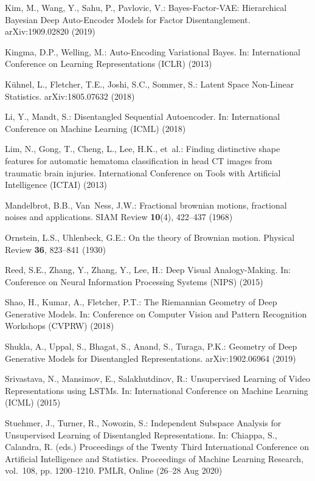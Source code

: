 \documentclass[runningheads]{llncs}
\begin{document}
\begin{thebibliography}{10}
	Kim, M., Wang, Y., Sahu, P., Pavlovic, V.: Bayes-{F}actor-{V}{A}{E}:
	{H}ierarchical {B}ayesian {D}eep {A}uto-{E}ncoder {M}odels for {F}actor
	{D}isentanglement. arXiv:1909.02820  (2019)
	
	Kingma, D.P., Welling, M.: Auto-{E}ncoding {V}ariational {B}ayes. In:
	International Conference on Learning Representations (ICLR) (2013)
	
	K{\"u}hnel, L., Fletcher, T.E., Joshi, S.C., Sommer, S.: Latent {S}pace
	{N}on-{L}inear {S}tatistics. arXiv:1805.07632  (2018)
	
	Li, Y., Mandt, S.: Disentangled {S}equential {A}utoencoder. In: International
	Conference on Machine Learning (ICML) (2018)
	
	Lim, N., Gong, T., Cheng, L., Lee, H.K., et~al.: Finding distinctive shape
	features for automatic hematoma classification in head {C}{T} images from
	traumatic brain injuries. International Conference on Tools with Artificial
	Intelligence (ICTAI)  (2013)
	
	Mandelbrot, B.B., Van~Ness, J.W.: Fractional brownian motions, fractional
	noises and applications. SIAM Review  \textbf{10}(4),  422--437 (1968)
	
	Ornstein, L.S., Uhlenbeck, G.E.: On the theory of {B}rownian motion. Physical
	Review  \textbf{36},  823--841 (1930)
	
	Reed, S.E., Zhang, Y., Zhang, Y., Lee, H.: Deep {V}isual {A}nalogy-{M}aking.
	In: Conference on Neural Information Processing Systems (NIPS) (2015)
	
	Shao, H., Kumar, A., Fletcher, P.T.: The {R}iemannian {G}eometry of {D}eep
	{G}enerative {M}odels. In: Conference on Computer Vision and Pattern
	Recognition Workshops (CVPRW) (2018)
	
	Shukla, A., Uppal, S., Bhagat, S., Anand, S., Turaga, P.K.: Geometry of {D}eep
	{G}enerative {M}odels for {D}isentangled {R}epresentations. arXiv:1902.06964
	(2019)
	
	Srivastava, N., Mansimov, E., Salakhutdinov, R.: Unsupervised {L}earning of
	{V}ideo {R}epresentations using {LSTM}s. In: International Conference on
	Machine Learning (ICML) (2015)
	
	Stuehmer, J., Turner, R., Nowozin, S.: Independent {S}ubspace {A}nalysis for
	{U}nsupervised {L}earning of {D}isentangled {R}epresentations. In: Chiappa,
	S., Calandra, R. (eds.) Proceedings of the Twenty Third International
	Conference on Artificial Intelligence and Statistics. Proceedings of Machine
	Learning Research, vol.~108, pp. 1200--1210. PMLR, Online (26--28 Aug 2020)
	

\end{thebibliography}
\end{document}
